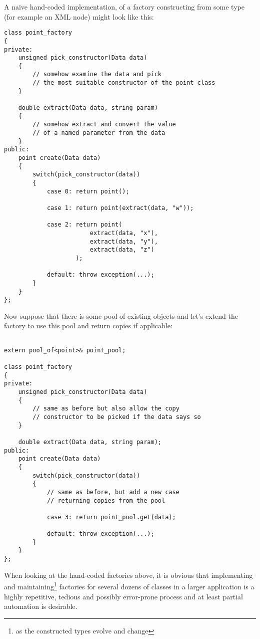 A naive hand-coded implementation, of a factory constructing
\verb@point@s from some \verb@Data@ type (for example an XML node) might look like this:

\begin{verbatim}
class point_factory
{
private:
    unsigned pick_constructor(Data data)
    {
        // somehow examine the data and pick
        // the most suitable constructor of the point class
    }

    double extract(Data data, string param)
    {
        // somehow extract and convert the value
        // of a named parameter from the data
    }
public:
    point create(Data data)
    {
        switch(pick_constructor(data))
        {
            case 0: return point();

            case 1: return point(extract(data, "w"));

            case 2: return point(
                        extract(data, "x"),
                        extract(data, "y"),
                        extract(data, "z")
                    );

            default: throw exception(...);
        }
    }
};
\end{verbatim}

Now suppose that there is some pool of existing \verb@point@ objects
and let's extend the factory to use this pool and return copies if applicable:

\begin{verbatim}

extern pool_of<point>& point_pool;

class point_factory
{
private:
    unsigned pick_constructor(Data data)
    {
        // same as before but also allow the copy
        // constructor to be picked if the data says so
    }

    double extract(Data data, string param);
public:
    point create(Data data)
    {
        switch(pick_constructor(data))
        {
            // same as before, but add a new case
            // returning copies from the pool

            case 3: return point_pool.get(data);

            default: throw exception(...);
        }
    }
};
\end{verbatim}

When looking at the hand-coded factories above, it is obvious that
implementing and maintaining\footnote{as the constructed types evolve and change}
factories for several dozens of classes in a larger
application is a highly repetitive, tedious and possibly error-prone
process and at least partial automation is desirable.

